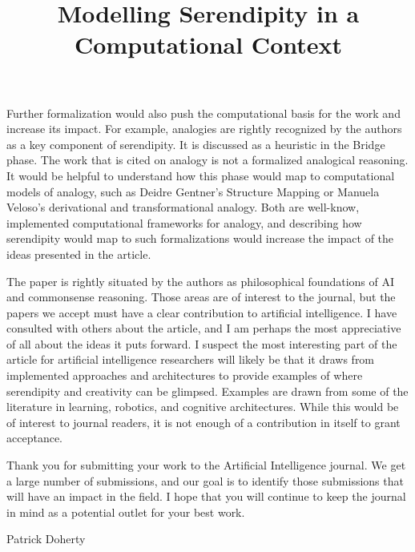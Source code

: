 \documentclass[natbib,a4paper,preprint,number,sort&compress,times]{elsarticle}
\begin{document}
\begin{frontmatter}
Further formalization would also push the computational basis for the work and increase its impact.  For example, analogies are rightly recognized by the authors as a key component of serendipity.  It is discussed as a heuristic in the Bridge phase.  The work that is cited on analogy is not a formalized analogical reasoning.  It would be helpful to understand how this phase would map to computational models of analogy, such as Deidre Gentner's Structure Mapping or Manuela Veloso's derivational and transformational analogy.  Both are well-know, implemented computational frameworks for analogy, and describing how serendipity would map to such formalizations would increase the impact of the ideas presented in the article.

The paper is rightly situated by the authors as philosophical foundations of AI and commonsense reasoning.  Those areas are of interest to the journal, but the papers we accept must have a clear contribution to artificial intelligence.  I have consulted with others about the article, and I am perhaps the most appreciative of all about the ideas it puts forward.  I suspect the most interesting part of the article for artificial intelligence researchers will likely be that it draws from implemented approaches and architectures to provide examples of where serendipity and creativity can be glimpsed. Examples are drawn from some of the literature in learning, robotics, and cognitive architectures.  While this would be of interest to journal readers, it is not enough of a contribution in itself to grant acceptance.

Thank you for submitting your work to the Artificial Intelligence journal.  We get a large number of submissions, and our goal is to identify those submissions that will have an impact in the field.  I hope that you will continue to keep the journal in mind as a potential outlet for your best work.

\hfill  Patrick Doherty

\clearpage
\fi

\title{Modelling Serendipity in a Computational Context}



\end{frontmatter}
\end{document}
